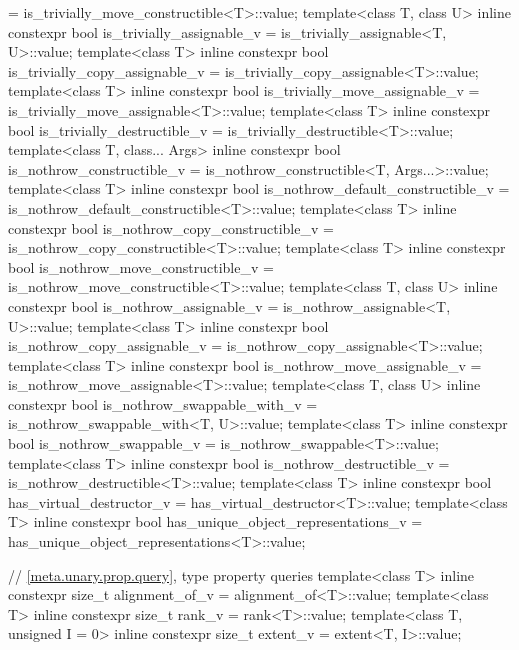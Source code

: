 \begin{codeblock}
{      = is_trivially_move_constructible<T>::value;
  template<class T, class U>
    inline constexpr bool is_trivially_assignable_v = is_trivially_assignable<T, U>::value;
  template<class T>
    inline constexpr bool is_trivially_copy_assignable_v
      = is_trivially_copy_assignable<T>::value;
  template<class T>
    inline constexpr bool is_trivially_move_assignable_v
      = is_trivially_move_assignable<T>::value;
  template<class T>
    inline constexpr bool is_trivially_destructible_v = is_trivially_destructible<T>::value;
  template<class T, class... Args>
    inline constexpr bool is_nothrow_constructible_v
      = is_nothrow_constructible<T, Args...>::value;
  template<class T>
    inline constexpr bool is_nothrow_default_constructible_v
      = is_nothrow_default_constructible<T>::value;
  template<class T>
    inline constexpr bool is_nothrow_copy_constructible_v
    = is_nothrow_copy_constructible<T>::value;
  template<class T>
    inline constexpr bool is_nothrow_move_constructible_v
      = is_nothrow_move_constructible<T>::value;
  template<class T, class U>
    inline constexpr bool is_nothrow_assignable_v = is_nothrow_assignable<T, U>::value;
  template<class T>
    inline constexpr bool is_nothrow_copy_assignable_v = is_nothrow_copy_assignable<T>::value;
  template<class T>
    inline constexpr bool is_nothrow_move_assignable_v = is_nothrow_move_assignable<T>::value;
  template<class T, class U>
    inline constexpr bool is_nothrow_swappable_with_v = is_nothrow_swappable_with<T, U>::value;
  template<class T>
    inline constexpr bool is_nothrow_swappable_v = is_nothrow_swappable<T>::value;
  template<class T>
    inline constexpr bool is_nothrow_destructible_v = is_nothrow_destructible<T>::value;
  template<class T>
    inline constexpr bool has_virtual_destructor_v = has_virtual_destructor<T>::value;
  template<class T>
    inline constexpr bool has_unique_object_representations_v
      = has_unique_object_representations<T>::value;

  // \ref{meta.unary.prop.query}, type property queries
  template<class T>
    inline constexpr size_t alignment_of_v = alignment_of<T>::value;
  template<class T>
    inline constexpr size_t rank_v = rank<T>::value;
  template<class T, unsigned I = 0>
    inline constexpr size_t extent_v = extent<T, I>::value;

}
\end{codeblock}
